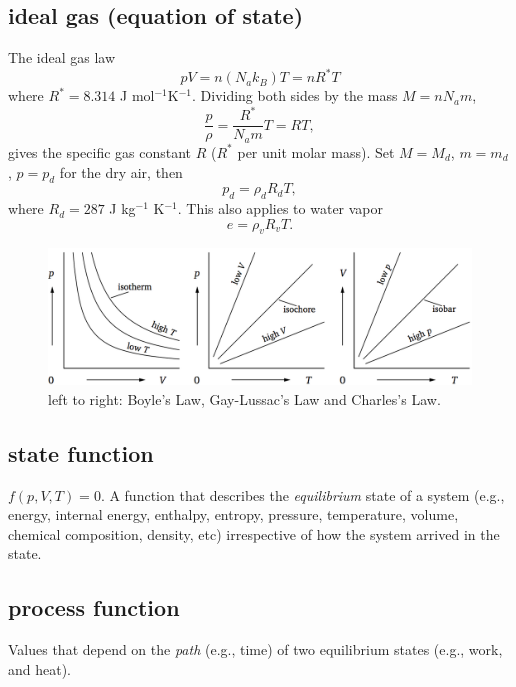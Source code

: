 \subsection{ideal gas (equation of state)}
\begin{defn*} The ideal gas law 
\begin{equation}
   p V = n (N_a k_B) T = n R^* T
\end{equation}
where $R^* = 8.314$ J mol$^{-1}$K$^{-1}$. Dividing both sides by the mass $M = n N_a m$,
\begin{equation}
   \frac{p}{\rho} = \frac{R^*}{N_a m} T = R T,
\end{equation}
gives the specific gas constant $R$ ($R^*$ per unit molar mass). Set $M=M_d$, $m=m_d$, $p=p_d$ for the dry air, then 
\begin{equation}
   p_d = \rho_d R_d T,
\end{equation}
where $R_d = 287$ J kg$^{-1}$ K$^{-1}$. This also applies to water vapor
\begin{equation}
   e = \rho_v R_v T.
\end{equation}

\begin{figure}[H]
   \includegraphics[width=1\textwidth, height=0.3\textwidth]{pVT.png}
   \caption{\label{pVT}
      left to right: Boyle's Law, Gay-Lussac's Law and Charles's Law.}
\end{figure}
\end{defn*}



\subsection{state function}
\begin{defn*} $f(p,V,T)=0$.  A function that describes the \emph{equilibrium} state of a system (e.g., energy,
internal energy, enthalpy, entropy, pressure, temperature, volume, chemical composition, density,
etc) irrespective of how the system arrived in the state. 
\end{defn*}

\subsection{process function}
\begin{defn*} Values that depend on the \emph{path} (e.g., time) of two equilibrium states (e.g.,
work, and heat).
\end{defn*}



